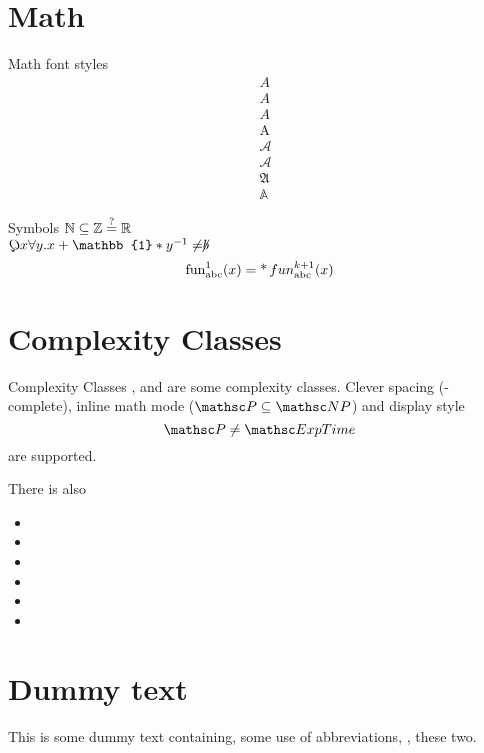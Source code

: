 \documentclass{article}
\begin{document}
\tableofcontents
\newpage

\section{Math}
\begin{latex-example}[lefthand width=3.5cm]{Math font styles}
\begin{align*}
	&A\\
	&\mathord{A}	\\ %
	&\mathit{A} 	\\ %
	&\mathrm{A} 	\\
	&\mathcal{A} 	\\
	&\mathscr{A} 	\\
	&\mathfrak{A} 	\\
	&\mathbb{A}
\end{align*}
\end{latex-example}

\begin{latex-example}[lefthand width=3.5cm]{Symbols}
$\mathbb{N} \subseteq \mathbb{Z} \stackrel{\text{?}}{=} \mathbb{R}$\\
$\quantor x \forall y. x + \mathbb{1} * y^{-1} \neq \blank$
\[
	\operatorname{fun}_{\mathrm{abc}}^{1} (x) = \operatorname{*}{fun}_{\mathrm{abc}}^{k+1} (x)
\]
\end{latex-example}


\section{Complexity Classes}
\begin{latex-example}[lefthand width=5cm]{Complexity Classes}
\PTime, \NP and  are some complexity classes.
Clever spacing (\NP-complete),
inline math mode ($\PTime \subseteq \NP$)
and display style
\[
	\PTime \neq \ExpTime
\]
are supported.

There is also
\begin{itemize}
	\item \kExpTime
	\item \NkExpTime 
	\item \kExpTime[4]
	\item \NkExpTime[4]
	\item \kExpSpace
	\item \kExpSpace[5]
\end{itemize}
\end{latex-example}

\newpage
\section{Dummy text}
This is some dummy text containing, \eg some use of abbreviations, \ie, these two.
\end{document}
